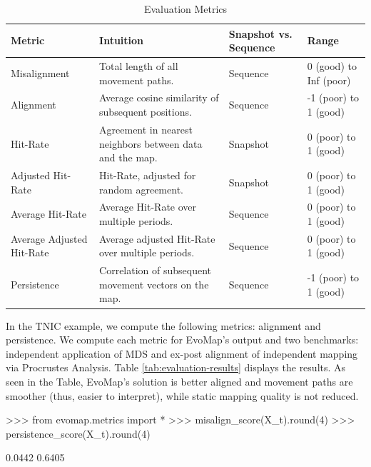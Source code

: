 \documentclass[article]{jss}
\begin{document}
\begin{table}[ht]
  \centering
  \begin{tabular}{p{3cm}p{4.5cm}p{2.5cm}p{3cm}}
  \hline
  \textbf{Metric} & \textbf{Intuition} & \textbf{Snapshot \newline vs. Sequence} & \textbf{Range} \\ \hline
  Misalignment & Total length of all movement paths. & Sequence & 0 (good) to Inf (poor) \\ 
  Alignment & Average cosine similarity of subsequent positions. & Sequence & -1 (poor) to 1 (good) \\ 
  Hit-Rate & Agreement in nearest neighbors between data and the map. & Snapshot & 0 (poor) to 1 (good) \\ 
  Adjusted \newline Hit-Rate & Hit-Rate, adjusted for random agreement. & Snapshot & 0 (poor) to 1 (good) \\ 
  Average Hit-Rate & Average Hit-Rate over multiple periods. & Sequence & 0 (poor) to 1 (good) \\ 
  Average Adjusted Hit-Rate & Average adjusted Hit-Rate over multiple periods. & Sequence & 0 (poor) to 1 (good) \\ 
  Persistence & Correlation of subsequent movement vectors on the map. & Sequence & -1 (poor) to 1 (good) \\ \hline
  \end{tabular}
  \caption{\label{tab:evaluation-metrics} Evaluation Metrics}
\end{table}

In the TNIC example, we compute the following metrics: alignment and persistence. 
We compute each metric for EvoMap's output and two benchmarks: independent application of MDS and ex-post alignment of independent mapping via 
Procrustes Analysis. Table \ref{tab:evaluation-results} displays the results. As seen in the Table, EvoMap's solution is 
better aligned and movement paths are smoother (thus, easier to interpret), while static mapping quality is not reduced. 

\begin{CodeChunk}
\begin{CodeInput}
>>> from evomap.metrics import *
>>> misalign_score(X_t).round(4)
>>> persistence_score(X_t).round(4)
\end{CodeInput}
\begin{CodeOutput}
0.0442
0.6405
\end{CodeOutput}
\end{CodeChunk}
\end{document}
